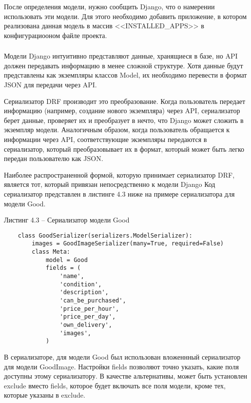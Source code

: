 После определения модели, нужно сообщить Django, что о намерении использовать эти модели.
Для этого необходимо добавить приложение, в котором реализована данная модель в массив <<INSTALLED\_APPS>> в конфигурациооном файле проекта.


\subsubsection{}

Модели Django интуитивно представляют данные, хранящиеся в базе, но API должен передавать информацию в менее сложной структуре.
Хотя данные будут представлены как экземпляры классов Model, их необходимо перевести в формат JSON для передачи через API.

Сериализатор DRF производит это преобразование.
Когда пользователь передает информацию (например, создание нового экземпляра) через API, сериализатор берет данные, проверяет их и преобразует в нечто, что Django может сложить в экземпляр модели.
Аналогичным образом, когда пользователь обращается к информации через API, соответствующие экземпляры передаются в сериализатор, который преобразовывает их в формат, который может быть легко передан пользователю как JSON.

Наиболее распространенной формой, которую принимает сериализатор DRF, является тот, который привязан непосредственно к модели Django
Код сериализатор представлен в листинге 4.3 ниже на примере сериализатора для модели Good.

Листинг 4.3 – Сериализатор модели Good
\begin{lstlisting}
    class GoodSerializer(serializers.ModelSerializer):
        images = GoodImageSerializer(many=True, required=False)
        class Meta:
            model = Good
            fields = (
                'name',
                'condition',
                'description',
                'can_be_purchased',
                'price_per_hour',
                'price_per_day',
                'own_delivery',
                'images',
            )
\end{lstlisting}

В сериализаторе, для модели Good был использован вложеннный сериализатор для модели GoodImage.
Настройки fields позволяют точно указать, какие поля доступны этому сериализатору.
В качестве альтернативы, может быть установлен exclude вместо fields, которое будет включать все поля модели, кроме тех, которые указаны в exclude.

\subsubsection{}

